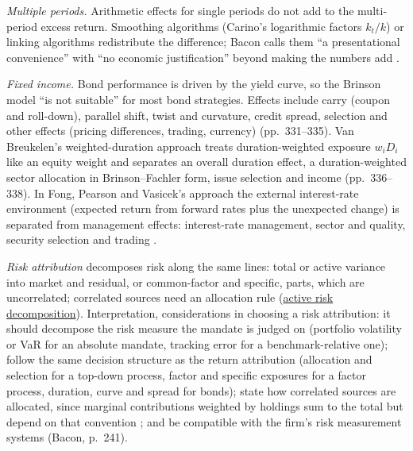 \begin{qfmethod}
\emph{Multiple periods.} Arithmetic effects for single periods do not add to the multi-period excess return. Smoothing algorithms (Carino's logarithmic factors $k_t/k$) or linking algorithms redistribute the difference; Bacon calls them ``a presentational convenience'' with ``no economic justification'' beyond making the numbers add \citep[pp.~361--363]{wide-bacon-attribution}.

\emph{Fixed income.} Bond performance is driven by the yield curve, so the Brinson model ``is not suitable'' for most bond strategies. Effects include carry (coupon and roll-down), parallel shift, twist and curvature, credit spread, selection and other effects (pricing differences, trading, currency) (pp.~331--335). Van Breukelen's weighted-duration approach treats duration-weighted exposure $w_iD_i$ like an equity weight and separates an overall duration effect, a duration-weighted sector allocation in Brinson--Fachler form, issue selection and income (pp.~336--338). In Fong, Pearson and Vasicek's approach the external interest-rate environment (expected return from forward rates plus the unexpected change) is separated from management effects: interest-rate management, sector and quality, security selection and trading \citep[chap.~12, pp.~764--765]{managing-investment-portfolios-2007}.

\emph{Risk attribution} decomposes risk along the same lines: total or active variance into market and residual, or common-factor and specific, parts, which are uncorrelated; correlated sources need an allocation rule \citep[chap.~3, p.~78]{alpha-grinold} (\hyperref[meth:active-risk-decomposition]{active risk decomposition}). Interpretation, considerations in choosing a risk attribution: it should decompose the risk measure the mandate is judged on (portfolio volatility or VaR for an absolute mandate, tracking error for a benchmark-relative one); follow the same decision structure as the return attribution (allocation and selection for a top-down process, factor and specific exposures for a factor process, duration, curve and spread for bonds); state how correlated sources are allocated, since marginal contributions weighted by holdings sum to the total but depend on that convention \citep[chap.~3, pp.~67 and~78]{alpha-grinold}; and be compatible with the firm's risk measurement systems (Bacon, p.~241).


\end{qfmethod}
